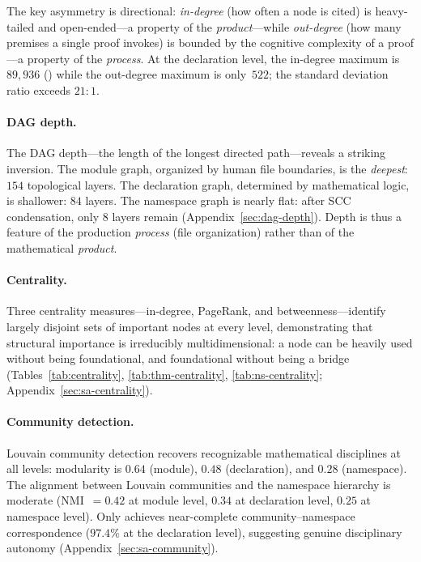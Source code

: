 The key asymmetry is directional: \emph{in-degree} (how often a node is cited) is heavy-tailed and open-ended---a property of the \emph{product}---while \emph{out-degree} (how many premises a single proof invokes) is bounded by the cognitive complexity of a proof---a property of the \emph{process}. At the declaration level, the in-degree maximum is $89{,}936$ () while the out-degree maximum is only~$522$; the standard deviation ratio exceeds $21:1$.

\paragraph{DAG depth.}
The DAG depth---the length of the longest directed path---reveals a striking inversion. The module graph, organized by human file boundaries, is the \emph{deepest}: $154$ topological layers. The declaration graph, determined by mathematical logic, is shallower: $84$ layers. The namespace graph is nearly flat: after SCC condensation, only $8$ layers remain (Appendix~\ref{sec:dag-depth}). Depth is thus a feature of the production \emph{process} (file organization) rather than of the mathematical \emph{product}.

\paragraph{Centrality.}
Three centrality measures---in-degree, PageRank, and betweenness---identify largely disjoint sets of important nodes at every level, demonstrating that structural importance is irreducibly multidimensional: a node can be heavily used without being foundational, and foundational without being a bridge (Tables~\ref{tab:centrality}, \ref{tab:thm-centrality}, \ref{tab:ns-centrality}; Appendix~\ref{sec:sa-centrality}).

\paragraph{Community detection.}
Louvain community detection recovers recognizable mathematical disciplines at all levels: modularity is $0.64$ (module), $0.48$ (declaration), and $0.28$ (namespace). The alignment between Louvain communities and the namespace hierarchy is moderate (NMI~$= 0.42$ at module level, $0.34$ at declaration level, $0.25$ at namespace level). Only  achieves near-complete community--namespace correspondence ($97.4\%$ at the declaration level), suggesting genuine disciplinary autonomy (Appendix~\ref{sec:sa-community}).

